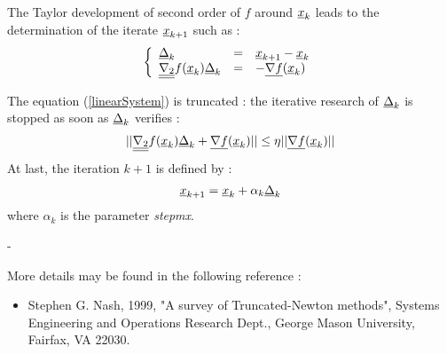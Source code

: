 {  The Taylor development of second order of $f$ around  ${\underline{x}}_k$ leads to the determination of the iterate ${\underline{x}}_{k+1}$ such as :
  \begin{equation}\label{linearSystem}
    \left\{
    \begin{array}{lcl}
      {\underline{\Delta}}_k & = & {\underline{x}}_{k+1} - {\underline{x}}_k  \\
      {\underline{\underline{\nabla_2}}} f({\underline{x}}_k){\underline{\Delta}}_k & = & -{\underline{\nabla f}}({\underline{x}}_k)
    \end{array}
    \right.
  \end{equation}

  The equation (\ref{linearSystem}) is truncated : the iterative research of ${\underline{\Delta}}_k$ is stopped as soon as ${\underline{\Delta}}_k$ verifies :
  \begin{align*}
    || {\underline{\underline{\nabla_2}}} f({\underline{x}}_k){\underline{\Delta}}_k + {\underline{\nabla f}}({\underline{x}}_k) || \leq \eta ||{\underline{\nabla f}}({\underline{x}}_k) ||
  \end{align*}
  At last, the iteration $k+1$ is defined by :
  \begin{align*}
    {\underline{x}}_{k+1} = {\underline{x}}_k + \alpha_k {\underline{\Delta}}_k
  \end{align*}
  where $\alpha_k$ is the parameter \textit{stepmx}.



}
{
  -
}

{
  More details may be found in the following reference :
  \begin{itemize}
  \item Stephen G. Nash, 1999, "A survey of Truncated-Newton methods", Systems Engineering and Operations Research Dept., George Mason University, Fairfax, VA 22030.
  \end{itemize}
}
